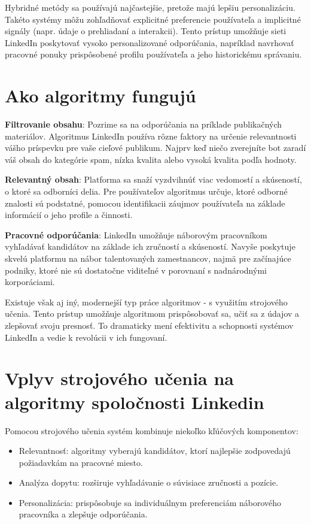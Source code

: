 \documentclass[slovak,a4paper]{coursepaper}
\begin{document}
Hybridné metódy sa používajú najčastejšie, pretože majú lepšiu personalizáciu. Takéto systémy môžu zohľadňovať explicitné preferencie používateľa a implicitné signály (napr. údaje o prehliadaní a interakcii). Tento prístup umožňuje sieti LinkedIn poskytovať vysoko personalizované odporúčania, napríklad navrhovať pracovné ponuky prispôsobené profilu používateľa a jeho historickému správaniu.~\cite{5}

\section{Ako algoritmy fungujú} \label{fungovanie}
\textbf{Filtrovanie obsahu}: Pozrime sa na odporúčania na príklade publikačných materiálov. Algoritmus LinkedIn používa rôzne faktory na určenie relevantnosti vášho príspevku pre vaše cieľové publikum. Najprv keď niečo zverejníte bot zaradí váš obsah do kategórie spam, nízka kvalita alebo vysoká kvalita podľa hodnoty.~\cite{6}

\textbf{Relevantný obsah}: Platforma sa snaží vyzdvihnúť viac vedomostí a skúseností, o ktoré sa odborníci delia. Pre používateľov algoritmus určuje, ktoré odborné znalosti sú podstatné, pomocou identifikacii záujmov používateľa na základe informácií o jeho profile a činnosti.~\cite{7}

\textbf{Pracovné odporúčania}: LinkedIn umožňuje náborovým pracovníkom vyhľadávať kandidátov na základe ich zručností a skúseností. Navyše poskytuje skvelú platformu na nábor talentovaných zamestnancov, najmä pre začínajúce podniky, ktoré nie sú dostatočne viditeľné v porovnaní s nadnárodnými korporáciami.~\cite{8}

Existuje však aj iný, modernejší typ práce algoritmov - s využitím strojového učenia. Tento prístup umožňuje algoritmom prispôsobovať sa, učiť sa z údajov a zlepšovať svoju presnosť. To dramaticky mení efektivitu a schopnosti systémov LinkedIn a vedie k revolúcii v ich fungovaní.

\section{Vplyv strojového učenia na algoritmy spoločnosti Linkedin} \label{strojové učenie}
Pomocou strojového učenia systém kombinuje niekoľko kľúčových komponentov:
\begin{itemize}
	\item Relevantnosť: algoritmy vyberajú kandidátov, ktorí najlepšie zodpovedajú požiadavkám na pracovné miesto.
	\item Analýza dopytu: rozširuje vyhľadávanie o súvisiace zručnosti a pozície.
	\item Personalizácia: prispôsobuje sa individuálnym preferenciám náborového pracovníka a zlepšuje odporúčania.
\end{itemize}
\end{document}
